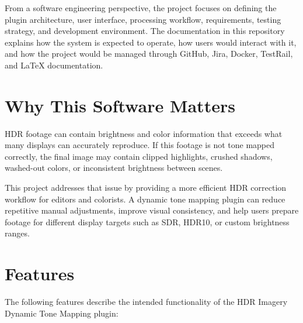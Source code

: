 \documentclass[11pt]{article}
\begin{document}
From a software engineering perspective, the project focuses on defining the plugin architecture, user interface, processing workflow, requirements, testing strategy, and development environment. The documentation in this repository explains how the system is expected to operate, how users would interact with it, and how the project would be managed through GitHub, Jira, Docker, TestRail, and LaTeX documentation.


\section{Why This Software Matters}

HDR footage can contain brightness and color information that exceeds what many displays can accurately reproduce. If this footage is not tone mapped correctly, the final image may contain clipped highlights, crushed shadows, washed-out colors, or inconsistent brightness between scenes.

This project addresses that issue by providing a more efficient HDR correction workflow for editors and colorists. A dynamic tone mapping plugin can reduce repetitive manual adjustments, improve visual consistency, and help users prepare footage for different display targets such as SDR, HDR10, or custom brightness ranges.


\section{Features}

The following features describe the intended functionality of the HDR Imagery Dynamic Tone Mapping plugin:
\end{document}
